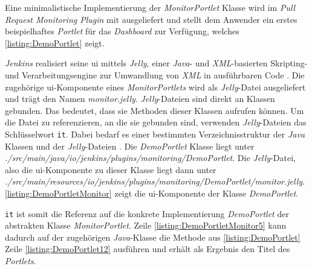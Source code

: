Eine minimalistische Implementierung der \textit{MonitorPortlet} Klasse wird im \textit{Pull Request Monitoring Plugin} mit ausgeliefert und stellt dem Anwender ein erstes beispielhaftes \textit{Portlet} für das \textit{Dashboard} zur Verfügung, welches \autoref{listing:DemoPortlet} zeigt.



\textit{Jenkins} realisiert seine \ac{ui} mittels \textit{Jelly}, einer \textit{Java}- und \textit{XML}-basierten Skripting- und Verarbeitungsengine zur Umwandlung von \textit{XML} in ausführbaren Code \citep{strachan_2017}. Die zugehörige \ac{ui}-Komponente eines \textit{MonitorPortlets} wird als \textit{Jelly}-Datei ausgeliefert und trägt den Namen \textit{monitor.jelly}. \textit{Jelly}-Dateien sind direkt an Klassen gebunden. Das bedeutet, dass sie Methoden dieser Klassen aufrufen können. Um die Datei zu referenzieren, an die sie gebunden sind, verwenden \textit{Jelly}-Dateien das Schlüsselwort \texttt{it}. Dabei bedarf es einer bestimmten Verzeichnisstruktur der \textit{Java} Klassen und der \textit{Jelly}-Dateien \citep{jenkins_jelly}. Die \textit{DemoPortlet} Klasse liegt unter \textit{./src/main/java/io/jenkins/plugins/monitoring/DemoPortlet}. Die \textit{Jelly}-Datei, also die \ac{ui}-Komponente zu dieser Klasse liegt dann unter \textit{./src/main/resources/io/jenkins/plugins/monitoring/DemoPortlet/monitor.jelly}. \autoref{listing:DemoPortletMonitor} zeigt die \ac{ui}-Komponente der Klasse \textit{DemoPortlet}.



\texttt{it} ist somit die Referenz auf die konkrete Implementierung \textit{DemoPortlet} der abstrakten Klasse \textit{MonitorPortlet}. Zeile \autoref{listing:DemoPortletMonitor5} kann dadurch auf der zugehörigen \textit{Java}-Klasse die Methode aus \autoref{listing:DemoPortlet} Zeile \autoref{listing:DemoPortlet12} ausführen und erhält als Ergebnis den Titel des \textit{Portlets}.

